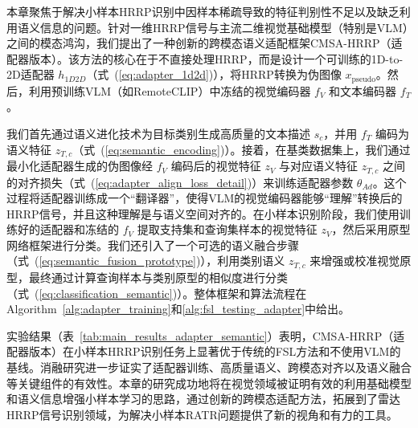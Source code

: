 本章聚焦于解决小样本HRRP识别中因样本稀疏导致的特征判别性不足以及缺乏利用语义信息的问题。针对一维HRRP信号与主流二维视觉基础模型（特别是VLM）之间的模态鸿沟，我们提出了一种创新的跨模态语义适配框架CMSA-HRRP（适配器版本）。该方法的核心在于不直接处理HRRP，而是设计一个可训练的1D-to-2D适配器 $h_{1D2D}$（式~(\ref{eq:adapter_1d2d})），将HRRP转换为伪图像 $x_{\text{pseudo}}$。然后，利用预训练VLM（如RemoteCLIP）中冻结的视觉编码器 $f_V$ 和文本编码器 $f_T$。

我们首先通过语义进化技术为目标类别生成高质量的文本描述 $s_c$，并用 $f_T$ 编码为语义特征 $z_{T,c}$（式~(\ref{eq:semantic_encoding})）。接着，在基类数据集上，我们通过最小化适配器生成的伪图像经 $f_V$ 编码后的视觉特征 $z_V$ 与对应语义特征 $z_{T,c}$ 之间的对齐损失（式~(\ref{eq:adapter_align_loss_detail})）来训练适配器参数 $\theta_{Ad}$。这个过程将适配器训练成一个“翻译器”，使得VLM的视觉编码器能够“理解”转换后的HRRP信号，并且这种理解是与语义空间对齐的。在小样本识别阶段，我们使用训练好的适配器和冻结的 $f_V$ 提取支持集和查询集样本的视觉特征 $z_V$，然后采用原型网络框架进行分类。我们还引入了一个可选的语义融合步骤（式~(\ref{eq:semantic_fusion_prototype})），利用类别语义 $z_{T,c}$ 来增强或校准视觉原型，最终通过计算查询样本与类别原型的相似度进行分类（式~(\ref{eq:classification_semantic})）。整体框架和算法流程在Algorithm~\ref{alg:adapter_training}和\ref{alg:fsl_testing_adapter}中给出。

实验结果（表~\ref{tab:main_results_adapter_semantic}）表明，CMSA-HRRP（适配器版本）在小样本HRRP识别任务上显著优于传统的FSL方法和不使用VLM的基线。消融研究进一步证实了适配器训练、高质量语义、跨模态对齐以及语义融合等关键组件的有效性。本章的研究成功地将在视觉领域被证明有效的利用基础模型和语义信息增强小样本学习的思路，通过创新的跨模态适配方法，拓展到了雷达HRRP信号识别领域，为解决小样本RATR问题提供了新的视角和有力的工具。

